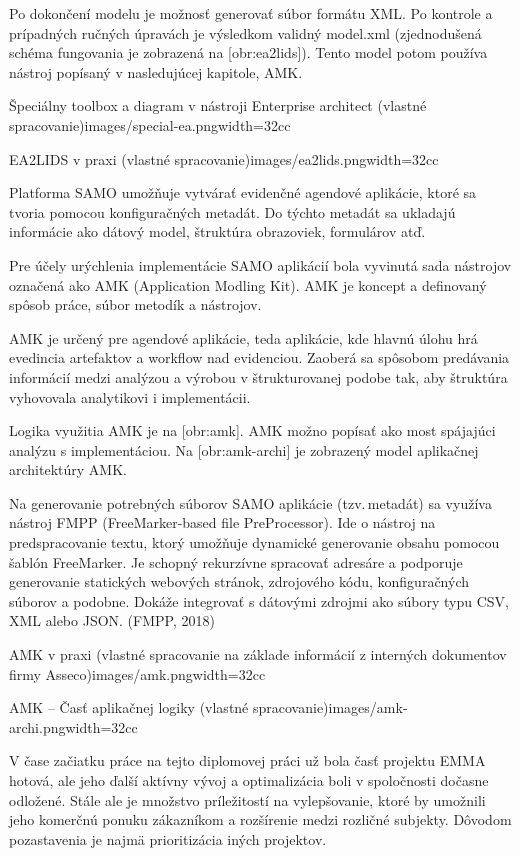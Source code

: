 Po dokončení modelu je možnosť generovať súbor formátu XML. Po kontrole a prípadných ručných úpravách je výsledkom validný model.xml (zjednodušená schéma fungovania je zobrazená na [obr:ea2lids]). Tento model potom používa nástroj popísaný v nasledujúcej kapitole, AMK.

{Špeciálny toolbox a diagram v nástroji Enterprise architect (vlastné spracovanie)}{images/special-ea.png}{width=32cc}

{EA2LIDS v praxi (vlastné spracovanie)}{images/ea2lids.png}{width=32cc}

Platforma SAMO umožňuje vytvárať evidenčné agendové aplikácie, ktoré sa tvoria pomocou konfiguračných metadát. Do týchto metadát sa ukladajú informácie ako dátový model, štruktúra obrazoviek, formulárov atď.

Pre účely urýchlenia implementácie SAMO aplikácií bola vyvinutá sada nástrojov označená ako AMK (Application Modling Kit). AMK je koncept a definovaný spôsob práce, súbor metodík a nástrojov. 

AMK je určený pre agendové aplikácie, teda aplikácie, kde hlavnú úlohu hrá evedincia artefaktov a workflow nad evidenciou. Zaoberá sa spôsobom predávania informácií medzi analýzou a výrobou v štrukturovanej podobe tak, aby štruktúra vyhovovala analytikovi i implementácii.

Logika využitia AMK je na [obr:amk]. AMK možno popísať ako most spájajúci analýzu s implementáciou. Na [obr:amk-archi] je zobrazený model aplikačnej architektúry AMK.

Na generovanie potrebných súborov SAMO aplikácie (tzv.\,metadát) sa využíva nástroj FMPP (FreeMarker-based file PreProcessor). Ide o nástroj na predspracovanie textu, ktorý umožňuje dynamické generovanie obsahu pomocou šablón FreeMarker. Je schopný rekurzívne spracovať adresáre a podporuje generovanie statických webových stránok, zdrojového kódu, konfiguračných súborov a podobne. Dokáže integrovať s dátovými zdrojmi ako súbory typu CSV, XML alebo JSON. \scr(FMPP, 2018)

{AMK v praxi (vlastné spracovanie na základe informácií z interných dokumentov firmy Asseco)}{images/amk.png}{width=32cc}

{AMK -- Časť aplikačnej logiky (vlastné spracovanie)}{images/amk-archi.png}{width=32cc}

\zlom
{}
V čase začiatku práce na tejto diplomovej práci už bola časť projektu EMMA hotová, ale  jeho ďalší aktívny vývoj a optimalizácia boli v spoločnosti dočasne odložené. Stále ale je množstvo príležitostí na vylepšovanie, ktoré by umožnili jeho komerčnú ponuku zákazníkom a rozšírenie medzi rozličné subjekty. Dôvodom pozastavenia je najmä prioritizácia iných projektov.

